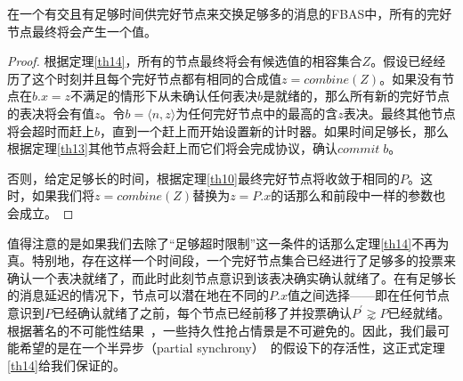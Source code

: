 \begin{theorem}\label{th14}
        在一个有{\quorum}交且有足够时间供完好节点来交换足够多的消息的FBAS中，所有的完好节点最终将会产生一个值。
\end{theorem}

\begin{proof}
        根据定理\ref{th14}，所有的节点最终将会有候选值的相容集合$Z$。假设已经经历了这个时刻并且每个完好节点都有相同的合成值$z=combine(Z)$。如果没有节点在$b.x=z$不满足的情形下从未确认任何表决$b$是就绪的，那么所有新的完好节点的表决将会有值$z$。令$b=\langle n,z\rangle$为任何完好节点中的最高的含$z$表决。最终其他节点将会超时而赶上$b$，直到一个{\quorum}赶上而开始设置新的计时器。如果时间足够长，那么根据定理\ref{th13}其他节点将会赶上而它们将会完成协议，确认$commit\;b$。
        
        否则，给定足够长的时间，根据定理\ref{th10}最终完好节点将收敛于相同的$P$。这时，如果我们将$z=combine(Z)$替换为$z=P.x$的话那么和前段中一样的参数也会成立。
\end{proof}

值得注意的是如果我们去除了``足够超时限制''这一条件的话那么定理\ref{th14}不再为真。特别地，存在这样一个时间段，一个完好节点集合已经进行了足够多的投票来确认一个表决就绪了，而此时此刻节点意识到该表决确实确认就绪了。在有足够长的消息延迟的情况下，节点可以潜在地在不同的$P.x$值之间选择——即在任何节点意识到$P$已经确认就绪了之前，每个节点已经前移了并投票确认$P^{\prime}\gnsim P$已经就绪。根据著名的不可能性结果~\cite{Fischer:1985:IDC:3149.214121}，一些持久性抢占情景是不可避免的。因此，我们最可能希望的是在一个半异步（partial synchrony）~\cite{Dwork:1988:CPP:42282.42283}的假设下的存活性，这正式定理\ref{th14}给我们保证的。